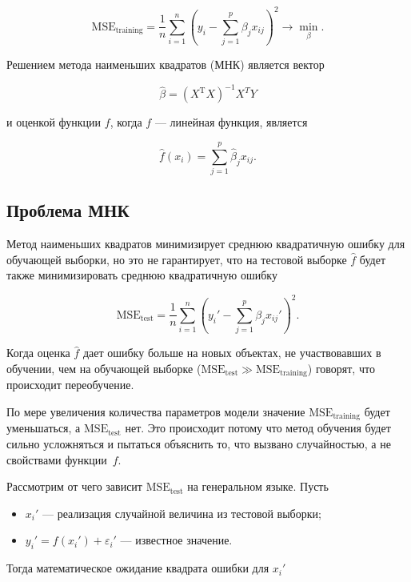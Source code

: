 \documentclass[specialist,
               subf,href,colorlinks=true, 12pt,a4paper]{article} %
\newcommand{\T}{\mathrm{T}}
\numberwithin{equation}{section}
\begin{document}
\begin{equation*}
\mathrm{MSE}_{\mathrm{training}} = \frac{1}{n}\sum_{i=1}^n(y_i - \sum_{j=1}^p \beta_j x_{ij})^2 \rightarrow \min_{\beta}.
\end{equation*}

Решением метода наименьших квадратов (МНК) является вектор

\begin{equation*}
\hat{\beta} = (X^{\T}X)^{-1} X^{T}Y
\end{equation*}

и оценкой функции $f$, когда $f$ --- линейная функция, является  

\begin{equation*}
\hat{f}(x_i) = \sum_{j=1}^p \hat{\beta}_j x_{ij}.
\end{equation*}

\subsection{Проблема МНК}

Метод наименьших квадратов минимизирует среднюю квадратичную ошибку для обучающей выборки, но это не гарантирует, что на тестовой выборке $\hat{f}$ будет также минимизировать среднюю квадратичную ошибку

\begin{equation*}
\mathrm{MSE}_{\mathrm{test}} = \frac{1}{n}\sum_{i=1}^n(y_i' - \sum_{j=1}^p \beta_j x_{ij}')^2.
\end{equation*}

Когда оценка $\hat{f}$ дает ошибку больше на новых объектах, не участвовавших в обучении, чем на обучающей выборке ($\mathrm{MSE}_{\mathrm{test}} \gg \mathrm{MSE}_{\mathrm{training}}  $) говорят, что происходит переобучение. 

По мере увеличения количества параметров модели значение $\mathrm{MSE}_{\mathrm{training}}$ будет уменьшаться, а $\mathrm{MSE}_{\mathrm{test}}$ нет. Это происходит потому что метод обучения будет сильно усложняться и пытаться объяснить то, что вызвано случайностью, а не свойствами функции~$f$.

Рассмотрим от чего зависит $\mathrm{MSE}_{\mathrm{test}}$ на генеральном языке. Пусть
\begin{itemize}
\item $x_i'$ --- реализация случайной величина из тестовой выборки;
\item $y_i' = f(x_i') + \varepsilon_i'$ --- известное значение.
\end{itemize}
Тогда математическое ожидание квадрата ошибки для $x_i'$
\end{document}
